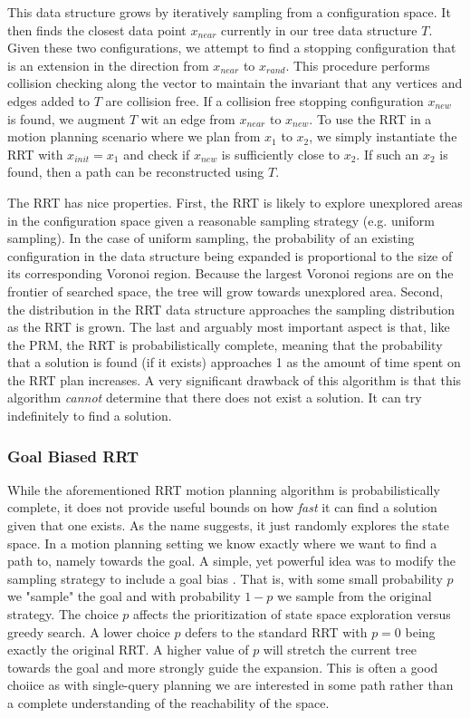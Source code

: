 This data structure grows by iteratively sampling from a configuration space. It then finds the closest data point $x_{near}$ currently in our tree data structure $T$. Given these two configurations, we attempt to find a stopping configuration that is an extension in the direction from $x_{near}$ to $x_{rand}$. This procedure performs collision checking along the vector to maintain the invariant that any vertices and edges added to $T$ are collision free. If a collision free stopping configuration $x_{new}$ is found, we augment $T$ wit an edge from $x_{near}$ to $x_{new}$. To use the RRT in a motion planning scenario where we plan from $x_1$ to $x_2$, we simply instantiate the RRT with $x_{init} = x_1$ and check if $x_{new}$ is sufficiently close to $x_2$. If such an $x_2$ is found, then a path can be reconstructed using $T$.

The RRT has nice properties. First, the RRT is likely to explore unexplored areas in the configuration space given a reasonable sampling strategy (e.g. uniform sampling). In the case of uniform sampling, the probability of an existing configuration in the data structure being expanded is proportional to the size of its corresponding Voronoi region. Because the largest Voronoi regions are on the frontier of searched space, the tree will grow towards unexplored area. Second, the distribution in the RRT data structure approaches the sampling distribution as the RRT is grown. The last and arguably most important aspect is that, like the PRM, the RRT is probabilistically complete, meaning that the probability that a solution is found (if it exists) approaches 1 as the amount of time spent on the RRT plan increases. A very significant drawback of this algorithm is that this algorithm \emph{cannot} determine that there does not exist a solution. It can try indefinitely to find a solution.

\subsubsection{Goal Biased RRT} \label{planning:goal-bias}
While the aforementioned RRT motion planning algorithm is probabilistically complete, it does not provide useful bounds on how \emph{fast} it can find a solution given that one exists. As the name suggests, it just randomly explores the state space. In a motion planning setting we know exactly where we want to find a path to, namely towards the goal. A simple, yet powerful idea was to modify the sampling strategy to include a goal bias \cite{lavalle:rrt}. That is, with some small probability $p$ we "sample" the goal and with probability $1-p$ we sample from the original strategy. The choice $p$ affects the prioritization of state space exploration versus greedy search. A lower choice $p$ defers to the standard RRT with $p=0$ being exactly the original RRT. A higher value of $p$ will stretch the current tree towards the goal and more strongly guide the expansion. This is often a good choiice as with single-query planning we are interested in some path rather than a complete understanding of the reachability of the space.

